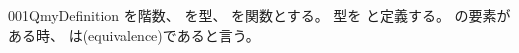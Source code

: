 \documentclass[index]{subfiles}
\begin{document}
\begin{myBlock}{001Q}{myDefinition}
  を階数、
  を型、
  を関数とする。
  型を
  と定義する。
  の要素がある時、
  は(equivalence)であると言う。
\end{myBlock}
\end{document}

